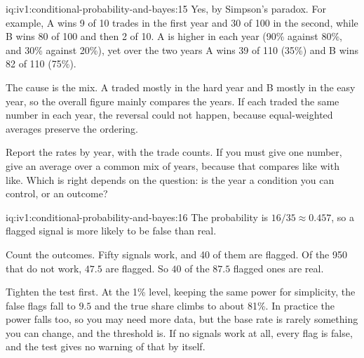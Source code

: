 \begin{solution}{iq:iv1:conditional-probability-and-bayes:15}
Yes, by Simpson's paradox. For example, A wins 9 of 10 trades in the first year and 30 of 100 in the second, while B wins 80 of 100 and then 2 of 10. A is higher in each year (90\% against 80\%, and 30\% against 20\%), yet over the two years A wins 39 of 110 (35\%) and B wins 82 of 110 (75\%).

The cause is the mix. A traded mostly in the hard year and B mostly in the easy year, so the overall figure mainly compares the years. If each traded the same number in each year, the reversal could not happen, because equal-weighted averages preserve the ordering.

Report the rates by year, with the trade counts. If you must give one number, give an average over a common mix of years, because that compares like with like. Which is right depends on the question: is the year a condition you can control, or an outcome?

\end{solution}

\begin{solution}{iq:iv1:conditional-probability-and-bayes:16}
The probability is $16/35 \approx 0.457$, so a flagged signal is more likely to be false than real.

Count the outcomes. Fifty signals work, and 40 of them are flagged. Of the 950 that do not work, $47.5$ are flagged. So $40$ of the $87.5$ flagged ones are real.

Tighten the test first. At the 1\% level, keeping the same power for simplicity, the false flags fall to $9.5$ and the true share climbs to about 81\%. In practice the power falls too, so you may need more data, but the base rate is rarely something you can change, and the threshold is. If no signals work at all, every flag is false, and the test gives no warning of that by itself.

\end{solution}

